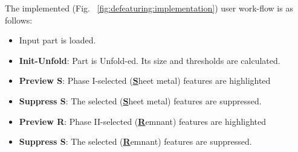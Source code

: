 The implemented (Fig. ~\ref{fig:defeaturing:implementation}) user work-flow is as follows:
\begin{itemize}
[noitemsep,topsep=2pt,parsep=2pt,partopsep=2pt,label=\textbullet]
\item Input part is loaded.
\item \textbf{Init-Unfold}: Part is Unfold-ed. Its size and thresholds are calculated.
\item \textbf{Preview S}: Phase I-selected (\underline{\bf S}heet metal) features are highlighted
\item \textbf{Suppress S}: The selected (\underline{\bf S}heet metal) features are suppressed.
\item \textbf{Preview R}: Phase II-selected (\underline{\bf R}emnant) features are highlighted
\item \textbf{Suppress S}: The selected (\underline{\bf R}emnant) features are suppressed.
\end{itemize}